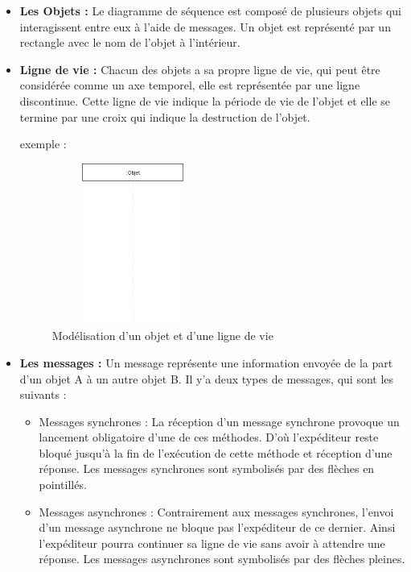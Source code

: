 \begin{itemize}
  
    \item \textbf{Les Objets :}
    Le diagramme de séquence est composé de plusieurs objets qui interagissent entre eux à l’aide de messages. Un objet est représenté par un rectangle avec le nom de l’objet à l’intérieur.
    
    \item \textbf{Ligne de vie :}
    Chacun des objets a sa propre ligne de vie, qui peut être considérée comme un axe temporel, elle est représentée par une ligne discontinue. Cette ligne de vie indique la période de vie de l’objet et elle se termine par une croix qui indique la destruction de l’objet.
        
       exemple :
       
       \begin{figure}[H]
       	\centering
       	\includegraphics[height=150pt,width=150pt]{img/chapter3/objet_ligne.png}
       	\caption{Modélisation d'un objet et d'une ligne de vie}
       \end{figure}
       
        
    \item \textbf{Les messages :}
     Un message représente une information envoyée de la part d’un objet A à un autre objet B. Il y’a deux types de messages, qui sont les suivants :
    
    \begin{itemize}
    	
    \item Messages synchrones : La réception d’un message synchrone provoque un lancement obligatoire d’une de ces méthodes. D’où l’expéditeur reste bloqué jusqu'à la fin de l’exécution de cette méthode et réception d’une réponse. Les messages synchrones sont symbolisés par des flèches en pointillés.
    
    \item Messages asynchrones : Contrairement aux messages synchrones, l’envoi d’un message asynchrone ne bloque pas l’expéditeur de ce dernier. Ainsi l’expéditeur pourra continuer sa ligne de vie sans avoir à attendre une réponse. Les messages asynchrones sont symbolisés par des flèches pleines.
 
    \end{itemize}   	

\end{itemize}

